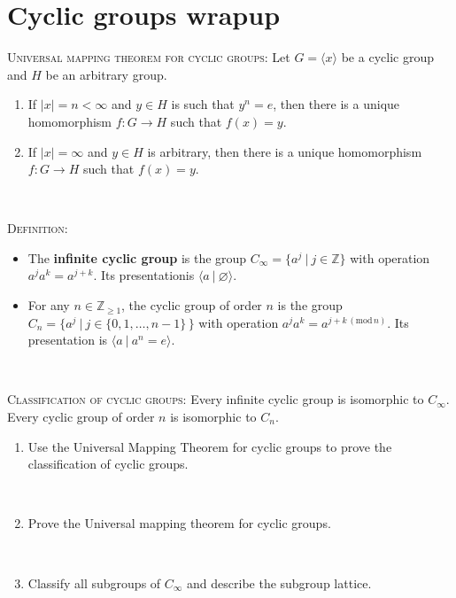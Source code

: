 \documentclass[12pt]{amsart}
\newcommand{\Bold}[1]{\contour{black}{#1}}
\newcommand{\showsol}[1]{\def\displaysol{#1}}
\newcommand\itemA{\stepcounter{enumi}\item[{\Bold{(\theenumi)}}]}
\newcommand\itemB{\stepcounter{enumi}\item[(\theenumi)]}
\begin{document}
\showsol{0}
	
	\thispagestyle{empty}
	
	\section*{Cyclic groups wrapup}
	
	

\begin{framed}

\textsc{Universal mapping theorem for cyclic groups:} Let $G = \langle x \rangle$ be a cyclic group and $H$ be an arbitrary group.
\begin{enumerate}
\item If $|x|=n<\infty$ and $y\in H$ is such that $y^n=e$, then there is a unique homomorphism $f:G\to H$ such that $f(x)=y$.
\item If $|x|=\infty$ and $y\in H$ is arbitrary, then there is a unique homomorphism $f:G\to H$ such that $f(x)=y$.
\end{enumerate}

\

\textsc{Definition:} \begin{itemize}
\item The \textbf{infinite cyclic group}  is the group $C_\infty = \{ a^j \ | \ j\in \mathbb{Z}\}$ with operation $a^j a^k = a^{j+k}$. Its presentation\footnotemark is $\langle a \ | \ \varnothing \rangle$. 
\item For any $n\in \mathbb{Z}_{\geq 1}$, the cyclic group of order $n$ is the group $C_n=\{ a^j \ | \ j\in \{0,1,\dots,n-1\} \, \}$ with operation $a^j a^k = a^{j+k \, (\mathrm{mod} \, n)}$. Its presentation is $\langle a \ | \ a^n = e\rangle$.
\end{itemize}

\

\textsc{Classification of cyclic groups:} Every infinite cyclic group is isomorphic to $C_\infty$. Every cyclic group of order $n$ is isomorphic to $C_n$.
\end{framed}


\begin{enumerate}
\itemA Use the Universal Mapping Theorem for cyclic groups to prove the classification of cyclic groups.

\

\itemA Prove the Universal mapping theorem for cyclic groups.

\

\itemB Classify all subgroups of $C_\infty$ and describe the subgroup lattice.
\end{enumerate}
\end{document}
